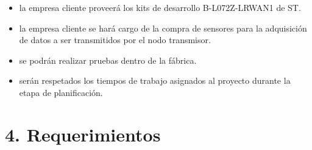 \documentclass[11pt]{charter}
\begin{document}
\begin{itemize}
\item la empresa cliente proveerá los kits de desarrollo B-L072Z-LRWAN1 de ST.
\item la empresa cliente se hará cargo de la compra de sensores para la adquisición de datos a ser transmitidos por el nodo transmisor.
\item se podrán realizar pruebas dentro de la fábrica.
\item serán respetados los tiempos de trabajo asignados al proyecto durante la etapa de planificación.
\end{itemize}

\section{4. Requerimientos}
\label{sec:requerimientos}
\end{document}

